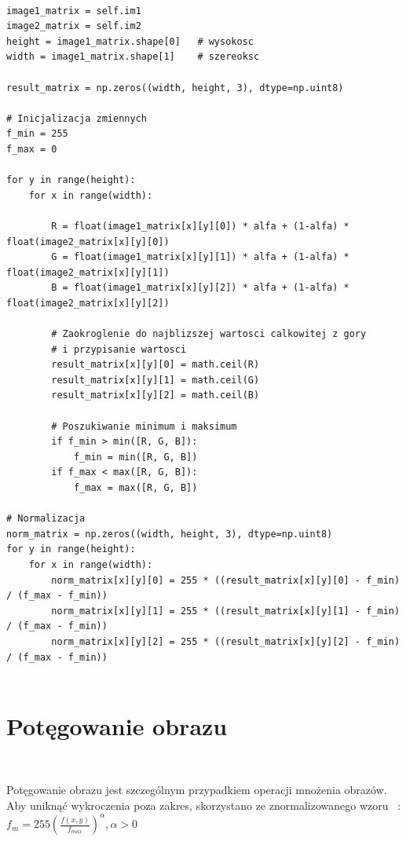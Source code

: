 \documentclass[final,a4paper,openany,12pt]{mwbk}
\begin{document}
\begin{lstlisting}[caption=Mieszanie obrazów barwowych z określonym współczynnikiem]

image1_matrix = self.im1
image2_matrix = self.im2
height = image1_matrix.shape[0]   # wysokosc
width = image1_matrix.shape[1]    # szereoksc

result_matrix = np.zeros((width, height, 3), dtype=np.uint8)

# Inicjalizacja zmiennych
f_min = 255
f_max = 0

for y in range(height):
    for x in range(width):  

        R = float(image1_matrix[x][y][0]) * alfa + (1-alfa) * float(image2_matrix[x][y][0])
        G = float(image1_matrix[x][y][1]) * alfa + (1-alfa) * float(image2_matrix[x][y][1])
        B = float(image1_matrix[x][y][2]) * alfa + (1-alfa) * float(image2_matrix[x][y][2])

        # Zaokroglenie do najblizszej wartosci calkowitej z gory
        # i przypisanie wartosci
        result_matrix[x][y][0] = math.ceil(R)
        result_matrix[x][y][1] = math.ceil(G)
        result_matrix[x][y][2] = math.ceil(B)

        # Poszukiwanie minimum i maksimum                
        if f_min > min([R, G, B]):
            f_min = min([R, G, B])
        if f_max < max([R, G, B]):
            f_max = max([R, G, B])

# Normalizacja
norm_matrix = np.zeros((width, height, 3), dtype=np.uint8)
for y in range(height):
    for x in range(width):
        norm_matrix[x][y][0] = 255 * ((result_matrix[x][y][0] - f_min) / (f_max - f_min))
        norm_matrix[x][y][1] = 255 * ((result_matrix[x][y][1] - f_min) / (f_max - f_min))
        norm_matrix[x][y][2] = 255 * ((result_matrix[x][y][2] - f_min) / (f_max - f_min))


\end{lstlisting}

\section{ Potęgowanie obrazu}

\hfill\\
\indent

\begin{center} Potęgowanie obrazu jest szczególnym przypadkiem operacji mnożenia obrazów. Aby uniknąć wykroczenia poza zakres, skorzystano ze znormalizowanego wzoru ~\cite{WykRat}:
		$f_{m} = 255(\frac{f(x,y)}{f_{max}}) ^{\alpha}, \alpha > 0 $
	\end{center}
\end{document}
